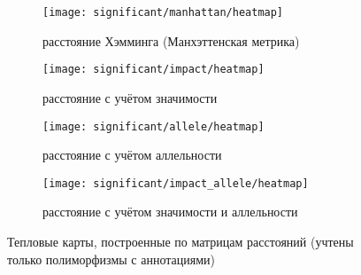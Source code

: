 \documentclass[main.tex]{subfiles}
\begin{document}
\begin{figure}[H]
    \centering
    \begin{subfigure}{.5\textwidth}
        \centering
        \texttt{[image: significant/manhattan/heatmap]}
        \captionsetup{width=.8\linewidth}
        \caption{расстояние Хэмминга (Манхэттенская метрика)}
        \label{fig:heatmap_manh}
    \end{subfigure}%
    \begin{subfigure}{.5\textwidth}
        \centering
        \texttt{[image: significant/impact/heatmap]}
        \captionsetup{width=.8\linewidth}
        \caption{расстояние с учётом значимости}
        \label{fig:heatmap_impact}
    \end{subfigure}

    \begin{subfigure}{.5\textwidth}
        \centering
        \texttt{[image: significant/allele/heatmap]}
        \captionsetup{width=.8\linewidth}
        \caption{расстояние с учётом аллельности}
        \label{fig:heatmap_allele}
    \end{subfigure}%
    \begin{subfigure}{.5\textwidth}
        \centering
        \texttt{[image: significant/impact\_allele/heatmap]}
        \captionsetup{width=.8\linewidth}
        \caption{расстояние с учётом значимости и аллельности}
        \label{fig:heatmap_impact_allele}
    \end{subfigure}
    \caption{Тепловые карты, построенные по матрицам расстояний (учтены только полиморфизмы с аннотациями)}
\end{figure}
\end{document}
